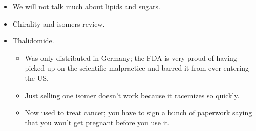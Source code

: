\documentclass[../notes.tex]{subfiles}
\begin{document}
\begin{itemize}
    \item We will not talk much about lipids and sugars.
    \item Chirality and isomers review.
    \item Thalidomide.
    \begin{itemize}
        \item Was only distributed in Germany; the FDA is very proud of having picked up on the scientific malpractice and barred it from ever entering the US.
        \item Just selling one isomer doesn't work because it racemizes so quickly.
        \item Now used to treat cancer; you have to sign a bunch of paperwork saying that you won't get pregnant before you use it.
    \end{itemize}
\end{itemize}
\end{document}
